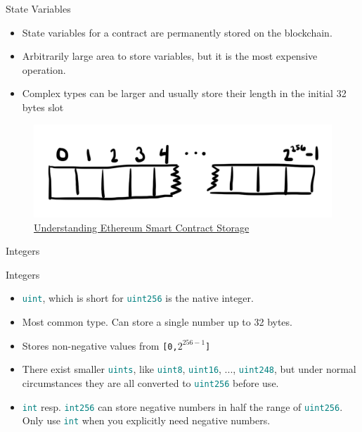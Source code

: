 \documentclass[handout]{beamer}
\begin{document}
\begin{frame}{State Variables}

	\begin{itemize}
		\item State variables for a contract are permanently stored on the blockchain.
		\item Arbitrarily large area to store variables, but it is the most expensive operation.
		\item Complex types can be larger and usually store their length in the initial 32 bytes slot
	\end{itemize}
	
	\begin{figure}
		\includegraphics[scale=0.2]{../assets/images/sc_storage}
\caption{\link \href{https://programtheblockchain.com/posts/2018/03/09/understanding-ethereum-smart-contract-storage/}{Understanding Ethereum Smart Contract Storage}}
		\label{fig:sc_storage}
	\end{figure}

\end{frame}

\begin{frame}{Integers}

	\begin{samplecode}{Integers}
		
	\end{samplecode}
	\begin{itemize}
		\item<2->{\texttt{\textcolor{teal}{uint}}, which is short for \texttt{\textcolor{teal}{uint256}} is the native integer.}
		\item<3->{Most common type. Can store a single number up to 32 bytes.}
		\item<4->{Stores non-negative values from \texttt{[0,$2^{256-1}$]}}
		\item<5->{There exist smaller \texttt{\textcolor{teal}{uints}}, like \texttt{\textcolor{teal}{uint8}}, \texttt{\textcolor{teal}{uint16}}, ..., \texttt{\textcolor{teal}{uint248}}, but under normal circumstances they are all converted to \texttt{\textcolor{teal}{uint256}} before use.}
		\item<6->{\texttt{\textcolor{teal}{int}} resp. \texttt{\textcolor{teal}{int256}} can store negative numbers in half the range of \texttt{\textcolor{teal}{uint256}}. Only use \texttt{\textcolor{teal}{int}} when you explicitly need negative numbers. }
	\end{itemize}

\end{frame}
\end{document}
